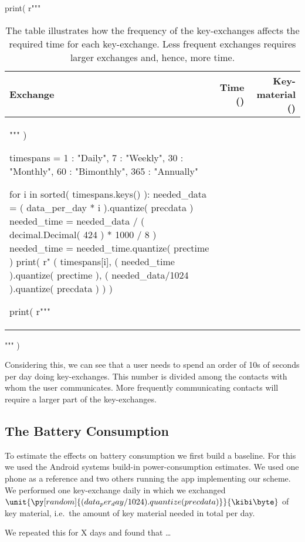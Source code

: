 \begin{table}
  \centering
  \caption{%
    The table illustrates how the frequency of the key-exchanges affects the 
    required time for each key-exchange.
    Less frequent exchanges requires larger exchanges and, hence, more time.
  }
  \label{tbl:MeetingsTradeoff}
  \begin{pycode}[random]
print( r"""
\begin{tabular}{lrr}
  Exchange &
  Time (\second) &
  Key-material (\kibi\byte) \\
  \toprule
""" )

timespans = {
  1 : "Daily",
  7 : "Weekly",
  30 : "Monthly",
  60 : "Bimonthly",
  365 : "Annually"
}

for i in sorted( timespans.keys() ):
  needed_data = ( data_per_day * i ).quantize( precdata )
  needed_time = needed_data / ( decimal.Decimal( 424 ) * 1000 / 8 )
  needed_time = needed_time.quantize( prectime )
  print( r"%
  ( timespans[i],
    ( needed_time ).quantize( prectime ),
    ( needed_data/1024 ).quantize( precdata )
    ) )

print( r"""
  \bottomrule
\end{tabular}
""" )
  \end{pycode}
\end{table}

Considering this, we can see that a user needs to spend an order of 10s of 
seconds per day doing key-exchanges.
This number is divided among the contacts with whom the user communicates.
More frequently communicating contacts will require a larger part of the 
key-exchanges.

\subsection{The Battery Consumption}
\label{sec:Battery}
To estimate the effects on battery consumption we first build a baseline.
For this we used the Android systems build-in power-consumption estimates.
We used one phone as a reference and two others running the app implementing 
our scheme.
We performed one key-exchange daily in which we exchanged 
\(\unit{\py[random]{(data_per_day/1024).quantize( precdata )}}{\kibi\byte}\) of 
key material, i.e.~the amount of key material needed in total per day.

We repeated this for X days and found that \dots


